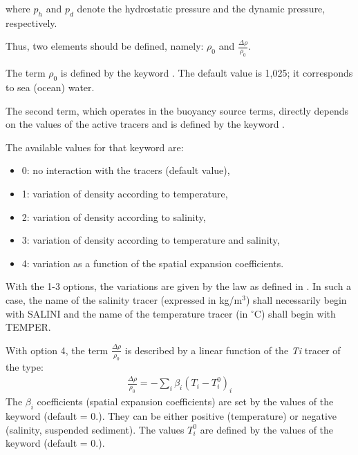 where $p_{h} $ and $p_{d} $ denote the hydrostatic pressure and the dynamic
pressure, respectively.

Thus, two elements should be defined, namely: $\rho _{0} $ and $\frac{\Delta
\rho }{\rho _{0} } $.

The term $\rho _{0} $ is defined by the keyword .
The default value is 1,025; it corresponds to sea (ocean) water.

The second term, which operates in the buoyancy source terms, directly depends
on the values of the active tracers and is defined by the keyword
.

The available values for that keyword  are:

\begin{itemize}
\item  0: no interaction with the tracers (default value),

\item  1: variation of density according to temperature,

\item  2: variation of density according to salinity,

\item  3: variation of density according to temperature and salinity,

\item  4: variation as a function of the spatial expansion coefficients.
\end{itemize}

With the 1-3 options, the variations are given by the law as defined in
. In such a case, the name of the salinity tracer (expressed in
kg/m${}^{3}$) shall necessarily begin with SALINI and the name of the
temperature tracer (in ${}^\circ$C) shall begin with TEMPER.

With option 4, the term $\frac{\Delta \rho }{\rho _{0} } $ is described by a
linear function of the \textit{Ti} tracer of the type:
\begin{align}
\frac{\Delta \rho }{\rho _{0} } =-\sum _{i}\beta _{i}  (T_{i} -T_{i}^{0} )_{i}
\end{align}
The $\beta_{i}$ coefficients (spatial expansion coefficients) are set by the
values of the keyword  (default
= 0.). They can be either positive (temperature) or negative (salinity,
suspended sediment). The values $T_{i}^{0}$ are defined by the values of the
keyword  (default = 0.).


